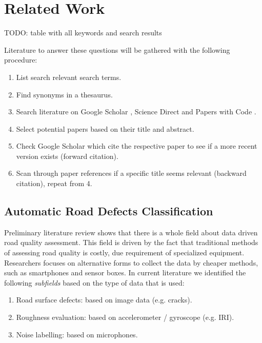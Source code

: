 \clearpage
\section{Related Work}

TODO: table with all keywords and search results

Literature to answer these questions will be gathered with the following procedure:
\begin{enumerate}
\item List search relevant search terms.
\item Find synonyms in a thesaurus.
\item Search literature on Google Scholar \cite{scholar}, Science Direct \cite{science-direct} and Papers with Code \cite{paperswithcode}. 
\item Select potential papers based on their title and abstract.
\item Check Google Scholar which cite the respective paper to see if a more recent version exists (forward citation).
\item Scan through paper references if a specific title seems relevant (backward citation), repeat from 4.
\end{enumerate}



\subsection{Automatic Road Defects Classification}

Preliminary literature review shows that there is a whole field about data driven road quality assessment. This field is driven by the fact that traditional methods of assessing road quality is costly, due requirement of specialized equipment. Researchers focuses on alternative forms to collect the data by cheaper methods, such as smartphones and sensor boxes. In current literature we identified the following \textit{subfields} based on the type of data that is used:

\begin{enumerate}
\item Road surface defects: based on image data (e.g. cracks).
\item Roughness evaluation: based on accelerometer / gyroscope (e.g. IRI).
\item Noise labelling: based on microphones.
\end{enumerate}

